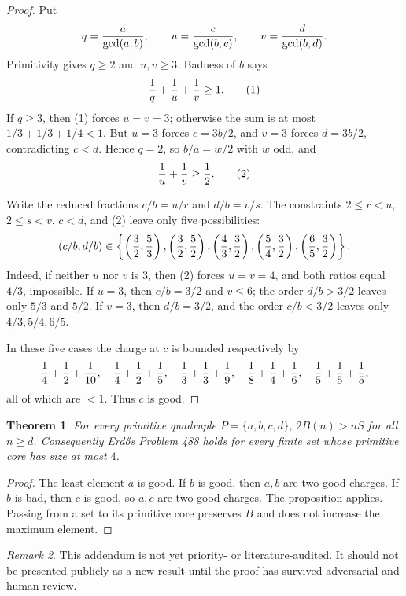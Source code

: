 \documentclass[11pt]{article}
\newtheorem{theorem}{Theorem}
\theoremstyle{remark}
\newtheorem{remark}[theorem]{Remark}
\begin{document}
\begin{proof}
Put
\[
q={a\over\gcd(a,b)},\qquad u={c\over\gcd(b,c)},\qquad
v={d\over\gcd(b,d)}.
\]
Primitivity gives \(q\ge2\) and \(u,v\ge3\).  Badness of \(b\) says
\[
  {1\over q}+{1\over u}+{1\over v}\ge1. \tag{1}
\]
If \(q\ge3\), then (1) forces \(u=v=3\); otherwise the sum is at most
\(1/3+1/3+1/4<1\).  But \(u=3\) forces \(c=3b/2\), and \(v=3\) forces
\(d=3b/2\), contradicting \(c<d\).  Hence \(q=2\), so \(b/a=w/2\) with \(w\)
odd, and
\[
  {1\over u}+{1\over v}\ge {1\over2}. \tag{2}
\]

Write the reduced fractions \(c/b=u/r\) and \(d/b=v/s\).  The constraints
\(2\le r<u\), \(2\le s<v\), \(c<d\), and (2) leave only five possibilities:
\[
(c/b,d/b)\in
\left\{\left({3\over2},{5\over3}\right),
\left({3\over2},{5\over2}\right),
\left({4\over3},{3\over2}\right),
\left({5\over4},{3\over2}\right),
\left({6\over5},{3\over2}\right)\right\}.
\]
Indeed, if neither \(u\) nor \(v\) is \(3\), then (2) forces \(u=v=4\), and
both ratios equal \(4/3\), impossible.  If \(u=3\), then \(c/b=3/2\) and
\(v\le6\); the order \(d/b>3/2\) leaves only \(5/3\) and \(5/2\).  If \(v=3\),
then \(d/b=3/2\), and the order \(c/b<3/2\) leaves only \(4/3,5/4,6/5\).

In these five cases the charge at \(c\) is bounded respectively by
\[
{1\over4}+{1\over2}+{1\over10},\quad
{1\over4}+{1\over2}+{1\over5},\quad
{1\over3}+{1\over3}+{1\over9},\quad
{1\over8}+{1\over4}+{1\over6},\quad
{1\over5}+{1\over5}+{1\over5},
\]
all of which are \(<1\).  Thus \(c\) is good.
\end{proof}

\begin{theorem}
For every primitive quadruple \(P=\{a,b,c,d\}\), \(2B(n)>nS\) for all \(n\ge d\).
Consequently Erd\H{o}s Problem 488 holds for every finite set whose primitive
core has size at most \(4\).
\end{theorem}

\begin{proof}
The least element \(a\) is good.  If \(b\) is good, then \(a,b\) are two good
charges.  If \(b\) is bad, then \(c\) is good, so \(a,c\) are two good charges.
The proposition applies.  Passing from a set to its primitive core preserves
\(B\) and does not increase the maximum element.
\end{proof}

\begin{remark}
This addendum is not yet priority- or literature-audited.  It should not be
presented publicly as a new result until the proof has survived adversarial and
human review.
\end{remark}
\end{document}
